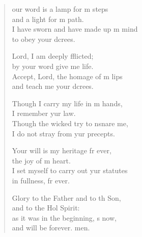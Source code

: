 \settowidth{\versewidth}{I set myself to carry out your statutes *}
\begin{verse}%
  \begin{patverse}
our word is a lamp for m steps\Med\\
and a light for m path.\\
I have sworn and have made up m mind\Med\\
to obey your dcrees.

Lord, I am deeply fflicted;\Med\\
by your word give me life.\\
Accept, Lord, the homage of m lips\Med\\
and teach me your dcrees.

Though I carry my life in m hands,\Med\\
I remember yur law.\\
Though the wicked try to nsnare me,\Med\\
I do not stray from yur precepts.

Your will is my heritage fr ever,\Med\\
the joy of m heart.\\
I set myself to carry out yur statutes\Med\\
in fullness, fr ever.

Glory to the Father and to th Son,\Med\\
and to the Hol Spirit:\\
as it was in the beginning, \pointup{\i}s now,\Med\\
and will be forever. men. 
  \end{patverse}
\end{verse}
